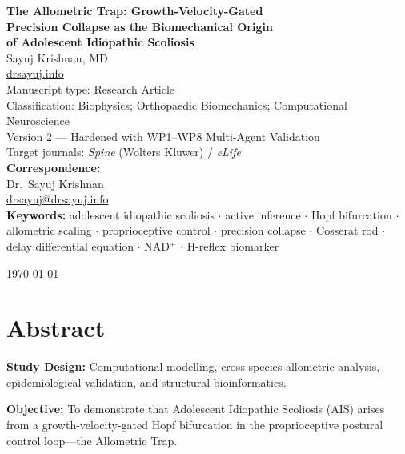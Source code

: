 \documentclass[12pt, letterpaper]{article}
\begin{document}
\begin{titlepage}
  \centering
  \vspace*{1.8cm}

  {\LARGE \textbf{The Allometric Trap: Growth-Velocity-Gated\\
  Precision Collapse as the Biomechanical Origin\\
  of Adolescent Idiopathic Scoliosis}}\\[1.5em]

  {\large Sayuj Krishnan, MD}\\[0.5em]
  {\normalsize \href{https://drsayuj.info}{drsayuj.info}}\\[2em]

  {\normalsize Manuscript type: Research Article}\\
  {\normalsize Classification: Biophysics; Orthopaedic Biomechanics;
               Computational Neuroscience}\\[1em]
  {\normalsize Version 2 --- Hardened with WP1--WP8 Multi-Agent Validation}\\[1em]
  {\normalsize Target journals:
    \textit{Spine} (Wolters Kluwer) /
    \textit{eLife}}\\[3em]

  \textbf{Correspondence:}\\
  Dr.\ Sayuj Krishnan\\
  \href{mailto:drsayuj@drsayuj.info}{drsayuj@drsayuj.info}\\[3em]

  \textbf{Keywords:} adolescent idiopathic scoliosis $\cdot$
    active inference $\cdot$ Hopf bifurcation $\cdot$
    allometric scaling $\cdot$ proprioceptive control $\cdot$
    precision collapse $\cdot$ Cosserat rod $\cdot$
    delay differential equation $\cdot$ NAD$^{+}$ $\cdot$
    H-reflex biomarker

  \vfill
  {\normalsize \today}
\end{titlepage}

\newpage
\section*{Abstract}

\noindent\textbf{Study Design:} Computational modelling, cross-species allometric
analysis, epidemiological validation, and structural bioinformatics.

\medskip
\noindent\textbf{Objective:} To demonstrate that Adolescent Idiopathic Scoliosis
(AIS) arises from a growth-velocity-gated Hopf bifurcation in the proprioceptive
postural control loop---the Allometric Trap.
\end{document}
